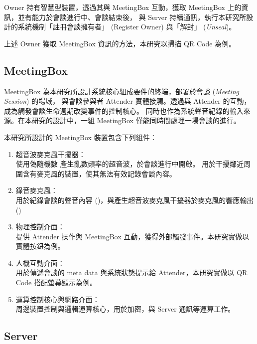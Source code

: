     Owner 持有智慧型裝置，透過其與 MeetingBox 互動，獲取 MeetingBox 上的資訊，並有能力於會談進行中、會談結束後，
與 Server 持續通訊，執行本研究所設計的系統機制「註冊會談擁有者」 (Register Owner) 與「解封」 ({\it Unseal})。

    上述 Owner 獲取 MeetingBox 資訊的方法，本研究以掃描 QR Code 為例。


\subsection{MeetingBox}

    MeetingBox 為本研究所設計系統核心組成要件的終端，部署於會談 ({\it Meeting Session}) 的場域，
與會談參與者 Attender 實體接觸。透過與 Attender 的互動，成為觸發會談生命週期改變事件的控制核心。
同時也作為系統聲音紀錄的輸入來源。在本研究的設計中，一組 MeetingBox 僅能同時間處理一場會談的進行。

    本研究所設計的 MeetingBox 裝置包含下列組件：

    \begin{enumerate}
        \item 超音波麥克風干擾器：\\
            使用偽隨機數 \DEFfuncPRNG 產生亂數頻率的超音波，於會談進行中開啟。
            用於干擾鄰近周圍含有麥克風的裝置，使其無法有效記錄會談內容。

        \item 錄音麥克風：\\
            用於紀錄會談的聲音內容 (\DEFrecJ)，與產生超音波麥克風干擾器於麥克風的響應輸出 (\DEFrecN)

        \item 物理控制介面：\\
            提供 Attender 操作與 MeetingBox 互動，獲得外部觸發事件。本研究實做以實體按鈕為例。

        \item 人機互動介面：\\
            用於傳遞會談的 meta data 與系統狀態提示給 Attender，本研究實做以 QR Code 搭配螢幕顯示為例。

        \item 運算控制核心與網路介面：\\
            周邊裝置控制與邏輯運算核心，用於加密，與 Server 通訊等運算工作。
    \end{enumerate}


\subsection{Server}

